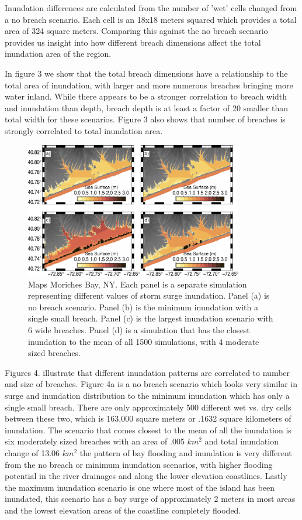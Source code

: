 \documentclass{coastal_paper}
\begin{document}
Inundation differences are calculated from the number of 'wet' cells changed from a no breach scenario. Each cell is an 18x18 meters squared which provides a total area of 324 square meters. Comparing this against the no breach scenario provides us insight into how different breach dimensions affect the total inundation area of the region.

In figure 3 we show that the total breach dimensions have a relationship to the total area of inundation, with larger and more numerous breaches bringing more water inland. While there appears to be a stronger correlation to breach width and inundation than depth, breach depth is at least a factor of 20 smaller than total width for these scenarios.
Figure 3 also shows that number of breaches is strongly correlated to total inundation area. 

\begin{figure}
    \centering
    \includegraphics[width=0.85\textwidth]{min_max_mean_inundation.pdf}

    \caption{Maps Moriches Bay, NY. Each panel is a separate simulation representing different values of storm surge inundation. Panel (a) is no breach scenario. Panel (b) is the minimum inundation with a single small breach. Panel (c) is the largest inundation scenario with 6 wide breaches. Panel (d)  is a simulation that has the closest inundation to the mean of all 1500 simulations, with 4 moderate sized breaches.}
    \label{fig:4}
\end{figure}

Figures 4. illustrate that different inundation patterns are correlated to number and size of breaches. Figure 4a is a no breach scenario which looks very similar in surge and inundation distribution to the minimum inundation which has only a single small breach. There are only approximately 500 different wet vs. dry cells between these two, which is 163,000 square meters or .1632 square kilometers of inundation. The scenario that comes closest to the mean of all the inundation is six moderately sized breaches with an area of .005 $km^2$ and total inundation change of 13.06 $km^2$ the pattern of bay flooding and inundation is very different from the no breach or minimum inundation scenarios, with higher flooding potential in the river drainages and along the lower elevation coastlines. Lastly the maximum inundation scenario is one where most of the island has been inundated, this scenario has a bay surge of approximately 2 meters in most areas and the lowest elevation areas of the coastline completely flooded.
\end{document}
